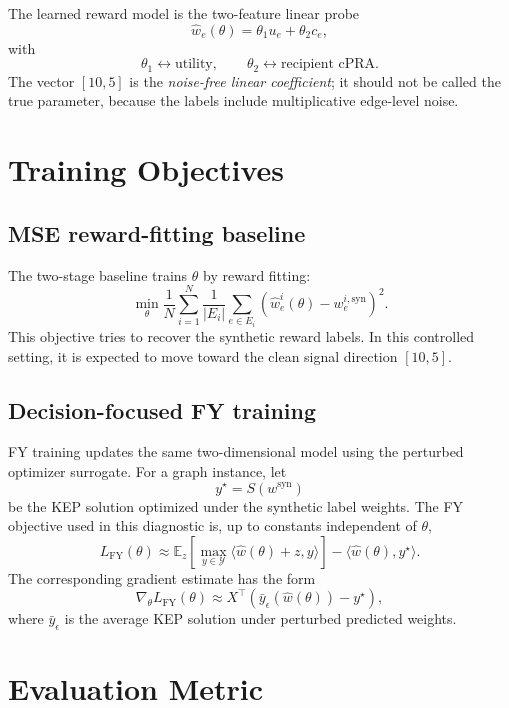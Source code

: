 \documentclass[11pt]{article}
\begin{document}
The learned reward model is the two-feature linear probe
\[
    \hat w_e(\theta)
    =
    \theta_1 u_e + \theta_2 c_e,
\]
with
\[
    \theta_1 \leftrightarrow \text{utility}, \qquad
    \theta_2 \leftrightarrow \text{recipient cPRA}.
\]
The vector \([10,5]\) is the \emph{noise-free linear coefficient}; it should not
be called the true parameter, because the labels include multiplicative
edge-level noise.

\section{Training Objectives}

\subsection{MSE reward-fitting baseline}

The two-stage baseline trains \(\theta\) by reward fitting:
\[
    \min_{\theta}
    \frac{1}{N}\sum_{i=1}^N
    \frac{1}{|E_i|}
    \sum_{e\in E_i}
    \left(
        \hat w^i_e(\theta) - w^{i,\mathrm{syn}}_e
    \right)^2.
\]
This objective tries to recover the synthetic reward labels. In this controlled
setting, it is expected to move toward the clean signal direction \([10,5]\).

\subsection{Decision-focused FY training}

FY training updates the same two-dimensional model using the perturbed
optimizer surrogate. For a graph instance, let
\[
    y^\star = S(w^{\mathrm{syn}})
\]
be the KEP solution optimized under the synthetic label weights. The FY
objective used in this diagnostic is, up to constants independent of \(\theta\),
\[
    L_{\mathrm{FY}}(\theta)
    \approx
    \mathbb{E}_{z}
    \left[
        \max_{y\in\mathcal{Y}}
        \langle \hat w(\theta)+z, y\rangle
    \right]
    -
    \langle \hat w(\theta), y^\star\rangle.
\]
The corresponding gradient estimate has the form
\[
    \nabla_{\theta} L_{\mathrm{FY}}(\theta)
    \approx
    X^\top
    \left(
        \bar y_\epsilon(\hat w(\theta)) - y^\star
    \right),
\]
where \(\bar y_\epsilon\) is the average KEP solution under perturbed predicted
weights.

\section{Evaluation Metric}
\end{document}
